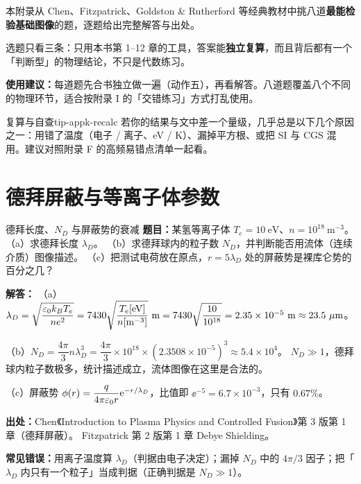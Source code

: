 
本附录从 Chen、Fitzpatrick、Goldston \& Rutherford 等经典教材中挑八道\textbf{最能检验基础图像}的题，逐题给出完整解答与出处。

选题只看三条：只用本书第 1--12 章的工具，答案能\textbf{独立复算}，而且背后都有一个「判断型」的物理结论，不只是代数练习。

\textbf{使用建议：}每道题先合书独立做一遍（动作五），再看解答。八道题覆盖八个不同的物理环节，适合按附录 I 的「交错练习」方式打乱使用。

\begin{tip}{复算与自查}{tip-appk-recalc}
若你的结果与文中差一个量级，几乎总是以下几个原因之一：用错了温度（电子 / 离子、eV / K）、漏掉平方根、或把 SI 与 CGS 混用。建议对照附录 F 的高频易错点清单一起看。
\end{tip}


\section{德拜屏蔽与等离子体参数}

\begin{example}{德拜长度、$N_D$ 与屏蔽势的衰减}{}
\textbf{题目：}某氢等离子体 $T_e=10\ \mathrm{eV}$、$n=10^{18}\ \mathrm{m^{-3}}$。
（a）求德拜长度 $\lambda_D$。
（b）求德拜球内的粒子数 $N_D$，并判断能否用流体（连续介质）图像描述。
（c）把测试电荷放在原点，$r=5\lambda_D$ 处的屏蔽势是裸库仑势的百分之几？

\textbf{解答：}
（a）$\lambda_D=\sqrt{\dfrac{\eps_0 k_BT_e}{ne^2}}=7430\sqrt{\dfrac{T_e[\mathrm{eV}]}{n[\mathrm{m^{-3}}]}}\ \mathrm{m}
=7430\sqrt{\dfrac{10}{10^{18}}}=2.35\times10^{-5}\ \mathrm{m}\approx23.5\ \mathrm{\mu m}$。

（b）$N_D=\dfrac{4\pi}{3}n\lambda_D^3
=\dfrac{4\pi}{3}\times10^{18}\times(2.3508\times10^{-5})^3\approx5.4\times10^{4}$。
$N_D\gg1$，德拜球内粒子数极多，统计描述成立，流体图像在这里是合法的。

（c）屏蔽势 $\phi(r)=\dfrac{q}{4\pi\varepsilon_0 r}\mathrm{e}^{-r/\lambda_D}$，比值即 $\ee^{-5}=6.7\times10^{-3}$，只有 $0.67\%$。

{\footnotesize
\textbf{出处：}Chen《Introduction to Plasma Physics and Controlled Fusion》第 3 版第 1 章（德拜屏蔽）。
Fitzpatrick 第 2 版第 1 章 Debye Shielding。
}

\textbf{常见错误：}用离子温度算 $\lambda_D$（判据由电子决定）；漏掉 $N_D$ 中的 $4\pi/3$ 因子；把「$\lambda_D$ 内只有一个粒子」当成判据（正确判据是 $N_D\gg1$）。
\end{example}


